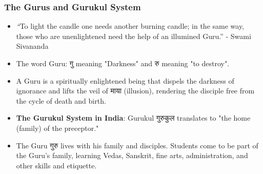 \begin{frame}[fragile]\frametitle{The Gurus and Gurukul System}
      \begin{itemize}
        \item {\textit “To light the candle one needs another burning candle; in the same way, those who are unenlightened need the help of an illumined Guru.”} - Swami Sivananda
          
          \item The word Guru:  गु meaning "Darkness" and रु meaning "to destroy". 
		  \item A Guru is a spiritually enlightened being that dispels the darkness of ignorance and lifts the veil of माया (illusion), rendering the disciple free from the cycle of death and birth.
          
          
          
          
          
        \item \textbf{The Gurukul System in India}: Gurukul गुरुकुल translates to "the home (family) of the preceptor." 
		\item The Guru गुरु lives with his family and disciples. Students come to be part of the Guru's family, learning Vedas, Sanskrit, fine arts, administration, and other skills and etiquette.
          
          
          
          
          
          
          
      \end{itemize}
\end{frame}


